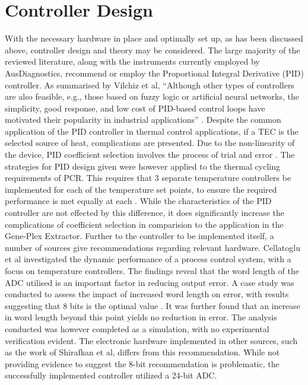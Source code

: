 \section{Controller Design}
With the necessary hardware in place and optimally set up, as has been discussed above, controller design and theory may be considered. The large majority of the reviewed literature, along with the instruments currently employed by AusDiagnostics, recommend or employ the Proportional Integral Derivative (PID) controller. As summarised by Vilchiz et al, ``Although other types of controllers are also feasible, e.g., those based on fuzzy logic or artificial neural networks, the simplicity, good response, and low cost of PID-based control loops have motivated their popularity in industrial applications'' \cite{20130415930883}\cite{20160801988967}. Despite the common application of the PID controller in thermal control applications, if a TEC is the selected source of heat, complications are presented. Due to the non-linearity of the device, PID coefficient selection involves the process of trial and error \cite{20160801988967}. The strategies for PID design given were however applied to the thermal cycling requirements of PCR. This requires that 3 separate temperature controllers be implemented for each of the temperature set points, to ensure the required performance is met equally at each \cite{20160801988967}. While the characteristics of the PID controller are not effected by this difference, it does significantly increase the complications of coefficient selection in comparision to the application in the Gene-Plex Extractor. Further to the controller to be implemented itself, a number of sources give recommendations regarding relevant hardware. Cellatoglu et al investigated the dynamic performance of a process control system, with a focus on temperature controllers. The findings reveal that the word length of the ADC utilised is an important factor in reducing output error. A case study was conducted to assess the impact of increased word length on error, with results suggesting that 8 bits is the optimal value \cite{12096602}. It was further found that an increase in word length beyond this point yields no reduction in error. The analysis conducted was however completed as a simulation, with no experimental verification evident. The electronic hardware implemented in other sources, such as the work of Shirafkan et al, differs from this recommendation. While  not providing evidence to suggest the 8-bit recommendation is problematic, the successfully implemented controller utilized a 24-bit ADC.\\

